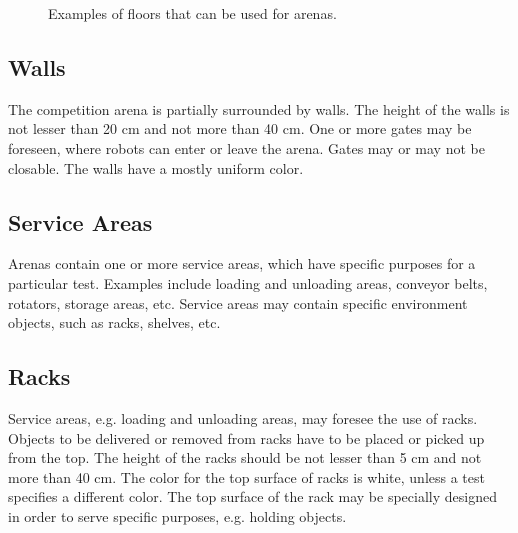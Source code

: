 \begin{figure}
\begin{center}
\end{center}

\caption{Examples of floors that can be used for \RCAW arenas.}
\label{example_floors}
\end{figure}

\subsection{Walls}
The competition arena is partially surrounded by walls. The height of the walls is not lesser than 20 cm and not more than 40 cm. One or more gates may be foreseen, where robots can enter or leave the arena. Gates may or may not be closable. The walls have a mostly uniform color.

\subsection{Service Areas}
Arenas contain one or more service areas, which have specific purposes for a particular test. Examples include loading and unloading areas, conveyor belts, rotators, storage areas, etc. Service areas may contain specific environment objects, such as racks, shelves, etc.

\subsection{Racks}
Service areas, e.g. loading and unloading areas, may foresee the use of racks. Objects to be delivered or removed from racks have to be placed or picked up from the top. The height of the racks should be not lesser than 5 cm and not more than 40 cm. The color for the top surface of racks is white, unless a test specifies a different color. The top surface of the rack may be specially designed in order to serve specific purposes, e.g. holding objects.

